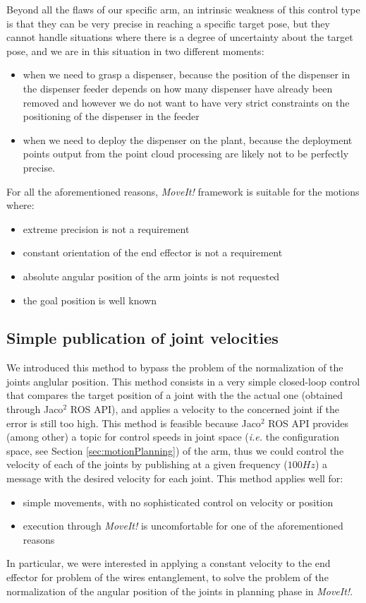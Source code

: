 Beyond all the flaws of our specific arm, an intrinsic weakness of this control type is that they can be very precise in reaching a specific target pose, but they cannot handle situations where there is a degree of uncertainty about the target pose, and we are in this situation in two different moments:
\begin{itemize}
	\item when we need to grasp a dispenser, because the position of the dispenser in the dispenser feeder depends on how many dispenser have already been removed and however we do not want to have very strict constraints on the positioning of the dispenser in the feeder
	\item when we need to deploy the dispenser on the plant, because the deployment points output from the point cloud processing are likely not to be perfectly precise.
\end{itemize}
For all the aforementioned reasons, \textit{MoveIt!} framework is suitable for the motions where:
\begin{itemize}
	\item extreme precision is not a requirement
	\item constant orientation of the end effector is not a requirement
	\item absolute angular position of the arm joints is not requested
	\item the goal position is well known
\end{itemize}

\subsection{Simple publication of joint velocities}
We introduced this method to bypass the problem of the normalization of the joints anglular position. This method consists in a very simple closed-loop control that compares the target position of a joint with the the actual one (obtained through Jaco$^2$ \ac{ROS} \ac{API}), and applies a velocity to the concerned joint if the error is still too high. This method is feasible because Jaco$^2$ \ac{ROS} \ac{API} provides (among other) a topic for control speeds in joint space (\textit{i.e.} the configuration space, see Section \ref{sec:motionPlanning}) of the arm, thus we could control the velocity of each of the joints by publishing at a given frequency ($100Hz$) a message with the desired velocity for each joint. This method applies well for:
\begin{itemize}
	\item simple movements, with no sophisticated control on velocity or position
	\item execution through \textit{MoveIt!} is uncomfortable for one of the aforementioned reasons
\end{itemize}
In particular, we were interested in applying a constant velocity to the end effector for problem of the wires entanglement, to solve the problem of the normalization of the angular position of the joints in planning phase in \textit{MoveIt!}.

